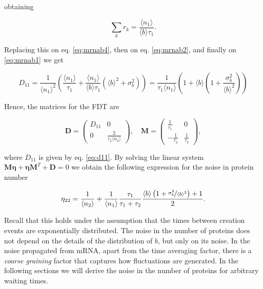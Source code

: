 obtaining

\begin{equation*}
   \sum_kr_k = \frac{\langle n_1\rangle}{\langle b\rangle\tau_1}.
\end{equation*}

Replacing this on eq. \eqref{eq:mrnab4}, then on eq. \eqref{eq:mrnab2}, and finally on \eqref{eq:mrnab1} we get

\begin{equation}
  \label{eq:d11}
  D_{11}=\frac{1}{\langle n_1\rangle^2}\left(\frac{\langle n_1\rangle}{\tau_1}+\frac{\langle n_1\rangle}{\langle b\rangle\tau_1}\left(\langle b\rangle^2+\sigma_b^2\right)\right) = \frac{1}{\tau_1\langle n_1\rangle}\left( 1+ \langle b\rangle\left(1+\frac{\sigma_b^2}{\langle b\rangle^2}\right)\right)
\end{equation}

Hence, the matrices for the FDT are

\begin{equation*}
  \mathbf{D} = 
  \begin{pmatrix}
    D_{11} & 0 \\
    0 & \frac{2}{\tau_2\langle n_2\rangle}
  \end{pmatrix}, \quad
  \mathbf{M} =
  \begin{pmatrix}
    \frac{1}{\tau_1} & 0 \\
    -\frac{1}{\tau_2} & \frac{1}{\tau_2}
  \end{pmatrix},
\end{equation*}

where $D_{11}$ is given by eq. \eqref{eq:d11}. By solving the linear system $\mathbf{M}\mathbf{\eta} + \mathbf{\eta M}^T+\mathbf{D}=0$ we obtain the following expression for the noise in protein number

\begin{equation*}
  \eta_{22}=\frac{1}{\langle n_2\rangle} + \frac{1}{\langle n_1\rangle} \frac{\tau_1}{\tau_1 + \tau_2} \frac{\langle b\rangle\left(1+\nicefrac{\sigma_b^2}{\langle b\rangle^2}\right)+1}{2}.
\end{equation*}

Recall that this holds under the assumption that the times between creation events are exponentially distributed. The noise in the number of proteins does not depend on the details of the distribution of $b$, but only on its noise. In the noise propagated from mRNA, apart from the time averaging factor, there is a \textit{coarse graining} factor that captures how fluctuations are generated. In the following sections we will derive the noise in the number of proteins for arbitrary waiting times.

